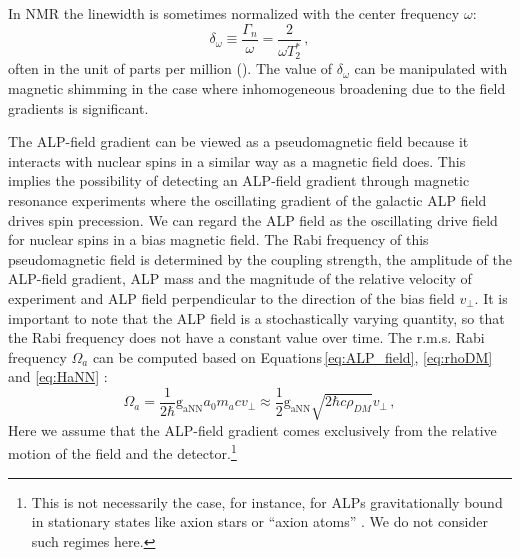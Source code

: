In NMR the linewidth is sometimes normalized with the center frequency $\omega$:
\begin{equation}
    \delta_\omega \equiv \dfrac{\Gamma_{n}}{\omega} = \dfrac{2}{\omega T_2^*}
    \,,\label{eq:delta_omega}
\end{equation}
often in the unit of parts per million (\SI{}{\ppm}). The value of $\delta_{\omega}$ can be manipulated with magnetic shimming in the case where inhomogeneous broadening due to the field gradients is significant. 

The ALP-field gradient can be viewed as a pseudomagnetic field
because it interacts with nuclear spins in a similar way as a magnetic field does. 
This implies the possibility of detecting an ALP-field gradient through magnetic resonance experiments where the oscillating gradient of the galactic ALP field drives spin precession.
We can regard the ALP field as the oscillating drive field for nuclear spins in a bias magnetic field. 
The Rabi frequency of this pseudomagnetic field is determined by the coupling strength, 
the amplitude of the ALP-field gradient, ALP mass and the magnitude of the relative velocity of experiment and ALP field perpendicular to the direction of the bias field $v_{\bot}$. 
It is important to note that the ALP field is a stochastically varying quantity, so that the Rabi frequency does not have a constant value over time. 
The r.m.s. Rabi frequency $\Omega_a$ can be computed based on Equations\,\eqref{eq:ALP_field}, \eqref{eq:rhoDM} and \eqref{eq:HaNN} \cite{Centers2021Stochastic}:
\begin{equation}
    \Omega_a = \dfrac{1}{2\hbar} \mathrm{g_{aNN}} a_0 m_a c v_{\bot} \approx \dfrac{1}{2} \mathrm{g_{aNN}} \sqrt{2\hbar c \rho_{DM}} v_{\bot}
    \,,\label{eq:Omega_a}
\end{equation}
Here we assume that the ALP-field gradient comes exclusively from the relative motion of the field and the detector.\footnote{This is not necessarily the case, for instance, for ALPs gravitationally bound %
in stationary states like axion stars or ``axion atoms'' \cite{Lam2017_PhysRevD, Liang_Zhitnitsky2019_GravitationallyPhysRevD}. We do not consider such regimes here. 
} 
